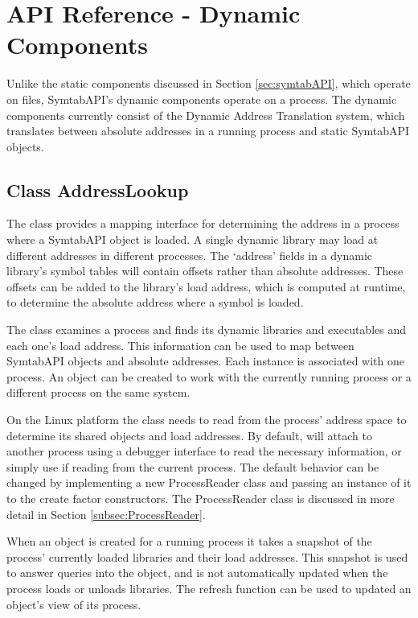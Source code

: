 \section{API Reference - Dynamic Components}

Unlike the static components discussed in Section \ref{sec:symtabAPI}, which operate on files,
SymtabAPI's dynamic components operate on a process. The dynamic components currently consist of the Dynamic Address Translation system, which translates between absolute addresses in a running process and static SymtabAPI objects. 

\subsection{Class AddressLookup}

The  class provides a mapping interface for determining the address in a process where a SymtabAPI object is loaded. A single dynamic library may load at different addresses in different processes. The `address' fields in a dynamic library's symbol tables will contain offsets rather than absolute addresses. These offsets can be added to the library's load address, which is computed at runtime, to determine the absolute address where a symbol is loaded. 

The  class examines a process and finds its dynamic libraries and executables and each one's load address. This information can be used to map between SymtabAPI objects and absolute addresses. Each  instance is associated with one process. An  object can be created to work with the currently running process or a different process on the same system.

On the Linux platform the  class needs to read from the process' address space to determine its shared objects and load addresses. By default,  will attach to another process using a debugger interface to read the necessary information, or simply use  if reading from the current process. The default behavior can be changed by implementing a new ProcessReader class and passing an instance of it to the
create factor constructors. The ProcessReader class is discussed in more detail in Section \ref{subsec:ProcessReader}.

When an  object is created for a running process it takes a snapshot of the process' currently loaded libraries and their load addresses. This snapshot is used to answer queries into the  object, and is not automatically updated when the process loads or unloads libraries. The refresh function can be used to updated an  object's view of its process.


